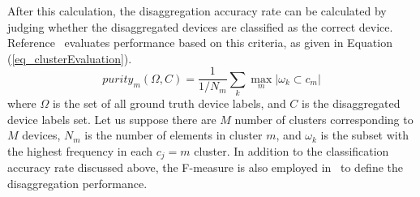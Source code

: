 After this calculation, the disaggregation accuracy rate
can be calculated by judging whether
the disaggregated devices are classified as the
correct device. Reference~\cite{gonccalves2011unsupervised} evaluates performance
based on this criteria, as given in Equation (\ref{eq_clusterEvaluation}).
\begin{equation}
\label{eq_clusterEvaluation}
purity_m(\Omega, C) = \frac{1}{1/N_m}\sum_k \max_m |\omega_k \subset c_m|
\end{equation}
where $\Omega$ is the set of all ground truth device labels,
and $C$ is the disaggregated device labels set.
Let us suppose there are $M$ number of clusters corresponding to $M$ devices,
$N_m$ is the number of elements in cluster $m$, 
and $\omega_k$ is the subset with the highest frequency in each $c_j=m$ cluster.
In addition to the classification accuracy rate discussed above, 
the F-measure is also employed in~\cite{zeifman2012disaggregation} 
to define the disaggregation performance.


%


